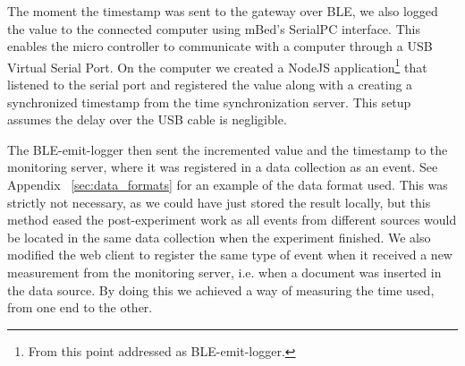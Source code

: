 The moment the timestamp was sent to the gateway over BLE, we also logged the value to the connected computer using mBed's SerialPC interface. This enables the micro controller to communicate with a computer through a USB Virtual Serial Port. On the computer we created a NodeJS application\footnote{ From this point addressed as BLE-emit-logger.} that listened to the serial port and registered the value along with a creating a synchronized timestamp from the time synchronization server. This setup assumes the delay over the USB cable is negligible. 

The BLE-emit-logger then sent the incremented value and the timestamp to the monitoring server, where it was registered in a data collection as an event. See Appendix ~\ref{sec:data_formats} for an example of the data format used. This was strictly not necessary, as we could have just stored the result locally, but this method eased the post-experiment work as all events from different sources would be located in the same data collection when the experiment finished. We also modified the web client to register the same type of event when it received a new measurement from the monitoring server, i.e. when a document was inserted in the data source. By doing this we achieved a way of measuring the time used, from one end to the other.

